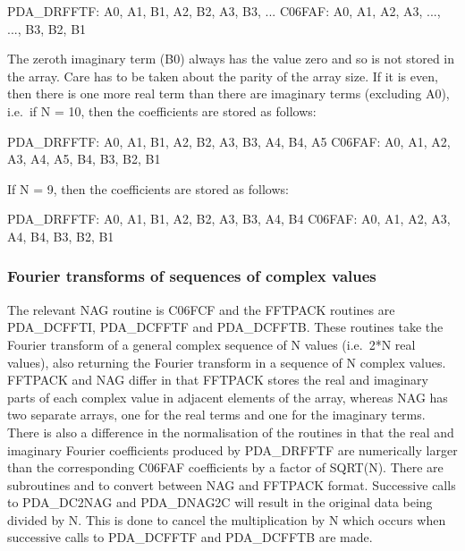 \documentclass[11pt,twoside,nolof]{starlink}
\begin{document}
\begin{terminalv}
   PDA_DRFFTF:  A0,    A1, B1,     A2, B2,     A3, B3,   ...
   C06FAF:      A0,    A1, A2, A3, ...,        ..., B3, B2, B1
\end{terminalv}

   The zeroth imaginary term (B0) always has the value zero and so is
   not stored in the array. Care has to be taken about the parity of the
   array size. If it is even, then there is one more real term than
   there are imaginary terms (excluding A0), i.e.\ if N = 10, then the
   coefficients are stored as follows:

\begin{terminalv}
   PDA_DRFFTF:  A0, A1, B1, A2, B2, A3, B3, A4, B4, A5
   C06FAF:      A0, A1, A2, A3, A4, A5, B4, B3, B2, B1
\end{terminalv}

   If N = 9, then the coefficients are stored as follows:

\begin{terminalv}
   PDA_DRFFTF:  A0, A1, B1, A2, B2, A3, B3, A4, B4
   C06FAF:      A0, A1, A2, A3, A4, B4, B3, B2, B1
\end{terminalv}


\subsubsection{Fourier transforms of sequences of complex values}

   The relevant NAG routine is C06FCF and the FFTPACK routines are
   PDA\_DCFFTI, PDA\_\-DCFFTF and PDA\_DCFFTB. These routines take the Fourier transform
   of a general complex sequence of N values (i.e.\ 2*N real values),
   also returning the Fourier transform in a sequence of N complex
   values. FFTPACK and NAG differ in that FFTPACK stores the real and
   imaginary parts of each complex value in adjacent elements of the
   array, whereas NAG has two separate arrays, one for the real terms
   and one for the imaginary terms. There is also a difference in the
   normalisation of the routines in that the real and imaginary Fourier
   coefficients produced by PDA\_DRFFTF are numerically larger than the
   corresponding C06FAF coefficients by a factor of SQRT(N). There are
   subroutines
 and
   to convert between NAG and FFTPACK format. Successive calls to
   PDA\_DC2NAG and PDA\_DNAG2C will result in the original data being divided by
   N. This is done to cancel the multiplication by N which occurs when
   successive calls to PDA\_DCFFTF and PDA\_DCFFTB are made.
\end{document}
